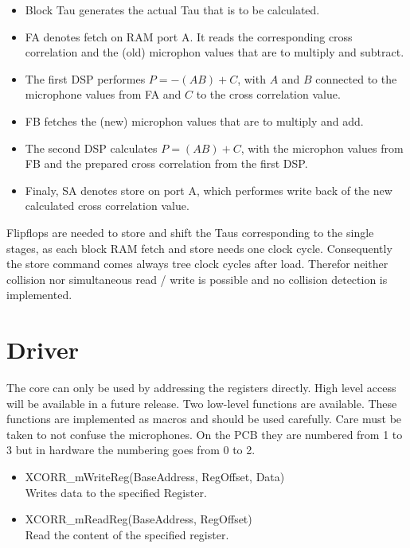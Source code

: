 \begin{itemize}
	\item Block Tau generates the actual Tau that is to be calculated.
	\item FA denotes fetch on RAM port A. It reads the corresponding cross correlation and the (old) 	microphon values that are to multiply and subtract.	
	\item The first DSP performes $P = -(AB)+C$, with $A$ and $B$ connected to the microphone values from FA and $C$ to the cross correlation value.
	\item FB fetches the (new) microphon values that are to multiply and add.
	\item The second DSP calculates $P = (AB)+C$, with the microphon values from FB and the prepared cross correlation from the first DSP.
	\item Finaly, SA denotes store on port A, which performes write back of the new calculated cross correlation value.
\end{itemize}

Flipflops are needed to store and shift the Taus corresponding to the single stages, as each block RAM fetch and store needs one clock cycle.
Consequently the store command comes always tree clock cycles after load.
Therefor neither collision nor simultaneous read / write is possible and no collision detection is implemented.

\section{Driver}
\label{sec::driver}

The core can only be used by addressing the registers directly.
High level access will be available in a future release.
Two low-level functions are available.
These functions are implemented as macros and should be used carefully.
Care must be taken to not confuse the microphones. 
On the PCB they are numbered from 1 to 3 but in hardware the numbering goes from 0 to 2.

\begin{itemize}
	\item XCORR\_mWriteReg(BaseAddress, RegOffset, Data) \\
		Writes data to the specified Register. 
	\item XCORR\_mReadReg(BaseAddress, RegOffset) \\		
		Read the content of the specified register.
\end{itemize}

